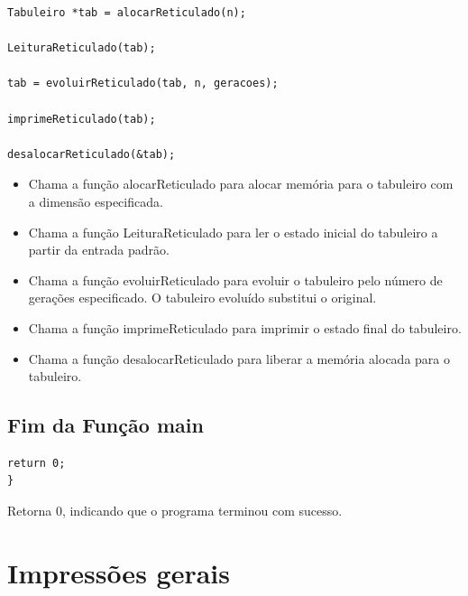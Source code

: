 \documentclass{article}
\begin{document}
\begin{lstlisting}[caption={},label={lst:cod1},language={[x86masm]Assembler}]
Tabuleiro *tab = alocarReticulado(n);

LeituraReticulado(tab);

tab = evoluirReticulado(tab, n, geracoes);

imprimeReticulado(tab);

desalocarReticulado(&tab);

\end{lstlisting}

\begin{itemize}

\item  Chama a função alocarReticulado para alocar memória para o tabuleiro com a dimensão especificada.

\item Chama a função LeituraReticulado para ler o estado inicial do tabuleiro a partir da entrada padrão.

\item Chama a função evoluirReticulado para evoluir o tabuleiro pelo número de gerações especificado. O tabuleiro evoluído substitui o original.

\item Chama a função imprimeReticulado para imprimir o estado final do tabuleiro.

\item Chama a função desalocarReticulado para liberar a memória alocada para o tabuleiro.

\end{itemize}

\subsection{Fim da Função main}

\begin{lstlisting}[caption={},label={lst:cod1},language={[x86masm]Assembler}]
return 0;
}

 \end{lstlisting}

 \par Retorna 0, indicando que o programa terminou com sucesso.

\section{Impressões gerais}
\end{document}
